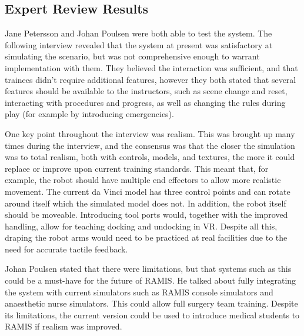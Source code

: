 \subsection{Expert Review Results}

Jane Petersson and Johan Poulsen were both able to test the system. The following interview revealed that the system at present was satisfactory at simulating the scenario, but was not comprehensive enough to warrant implementation with them. They believed the interaction was sufficient, and that trainees didn't require additional features, however they both stated that several features should be available to the instructors, such as scene change and reset, interacting with procedures and progress, as well as changing the rules during play (for example by introducing emergencies).

One key point throughout the interview was realism. This was brought up many times during the interview, and the consensus was that the closer the simulation was to total realism, both with controls, models, and textures, the more it could replace or improve upon current training standards. This meant that, for example, the robot should have multiple end effectors to allow more realistic movement. The current da Vinci model has three control points and can rotate around itself which the simulated model does not. In addition, the robot itself should be moveable. Introducing tool ports would, together with the improved handling, allow for teaching docking and undocking in VR. Despite all this, draping the robot arms would need to be practiced at real facilities due to the need for accurate tactile feedback.

Johan Poulsen stated that there were limitations, but that systems such as this could be a must-have for the future of RAMIS. He talked about fully integrating the system with current simulators such as RAMIS console simulators and anaesthetic nurse simulators. This could allow full surgery team training. Despite its limitations, the current version could be used to introduce medical students to RAMIS if realism was improved.


